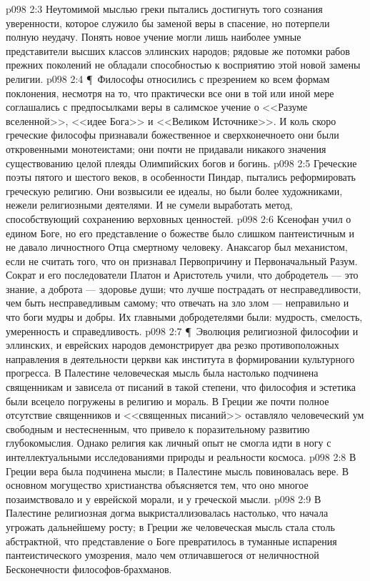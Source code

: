 \vs p098 2:3 Неутомимой мыслью греки пытались достигнуть того сознания уверенности, которое служило бы заменой веры в спасение, но потерпели полную неудачу. Понять новое учение могли лишь наиболее умные представители высших классов эллинских народов; рядовые же потомки рабов прежних поколений не обладали способностью к восприятию этой новой замены религии.
\vs p098 2:4 \P\ Философы относились с презрением ко всем формам поклонения, несмотря на то, что практически все они в той или иной мере соглашались с предпосылками веры в салимское учение о <<Разуме вселенной>>, <<идее Бога>> и <<Великом Источнике>>. И коль скоро греческие философы признавали божественное и сверхконечноето они были откровенными монотеистами; они почти не придавали никакого значения существованию целой плеяды Олимпийских богов и богинь.
\vs p098 2:5 Греческие поэты пятого и шестого веков, в особенности Пиндар, пытались реформировать греческую религию. Они возвысили ее идеалы, но были более художниками, нежели религиозными деятелями. И не сумели выработать метод, способствующий сохранению верховных ценностей.
\vs p098 2:6 Ксенофан учил о едином Боге, но его представление о божестве было слишком пантеистичным и не давало личностного Отца смертному человеку. Анаксагор был механистом, если не считать того, что он признавал Первопричину и Первоначальный Разум. Сократ и его последователи Платон и Аристотель учили, что добродетель --- это знание, а доброта --- здоровье души; что лучше пострадать от несправедливости, чем быть несправедливым самому; что отвечать на зло злом --- неправильно и что боги мудры и добры. Их главными добродетелями были: мудрость, смелость, умеренность и справедливость.
\vs p098 2:7 \P\ Эволюция религиозной философии и эллинских, и еврейских народов демонстрирует два резко противоположных направления в деятельности церкви как института в формировании культурного прогресса. В Палестине человеческая мысль была настолько подчинена священникам и зависела от писаний в такой степени, что философия и эстетика были всецело погружены в религию и мораль. В Греции же почти полное отсутствие священников и <<священных писаний>> оставляло человеческий ум свободным и нестесненным, что привело к поразительному развитию глубокомыслия. Однако религия как личный опыт не смогла идти в ногу с интеллектуальными исследованиями природы и реальности космоса.
\vs p098 2:8 В Греции вера была подчинена мысли; в Палестине мысль повиновалась вере. В основном могущество христианства объясняется тем, что оно многое позаимствовало и у еврейской морали, и у греческой мысли.
\vs p098 2:9 В Палестине религиозная догма выкристаллизовалась настолько, что начала угрожать дальнейшему росту; в Греции же человеческая мысль стала столь абстрактной, что представление о Боге превратилось в туманные испарения пантеистического умозрения, мало чем отличавшегося от неличностной Бесконечности философов\hyp{}брахманов.
